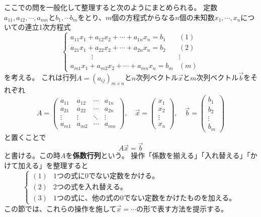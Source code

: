 \documentclass[10pt]{jsreport}
\theoremstyle{definition}%
\newcommand{\kakko}[1]{\left(#1 \right)} %
\newcommand{\vc}[1]{\overrightarrow{#1}}%
\numberwithin{equation}{section}%
\begin{document}
ここでの問を一般化して整理すると次のようにまとめられる。
定数$a_{11},a_{12},\cdots, a_{mn}$と$b_{1},\cdots b_{m}$をとり、$m$個の方程式からなる$n$個の未知数$x_{1},\cdots, x_{n}$についての連立1次方程式
\begin{equation}
  \label{renho-ippan}  \begin{cases}
      a_{11}x_{1}+a_{12}x_{2}+\cdots +a_{1n}x_{n} =b_{1} &  (1)\\
      a_{21}x_{1}+a_{22}x_{2}+\cdots +a_{2n}x_{n} =b_{2} &  (2)\\
      \quad \quad \quad   \vdots & \vdots \\
      a_{m1}x_{1}+a_{m2}x_{2}+\cdots +a_{mn}x_{n} =b_{m} &  (m)
    \end{cases} 
  \end{equation}
を考える。
これは行列$A=(a_{ij})_{m\times n}$と$n$次列ベクトル$\vc{x}$と$m$次列ベクトル$\vc{b}$をそれぞれ
\begin{equation}
  A= \kakko{\begin{matrix}
    a_{11} & a_{12} & \cdots & a_{1n} \\
    a_{21} & a_{22} & \cdots & a_{2n} \\
    \vdots & \vdots & \ddots & \vdots \\
    a_{m1} & a_{m2} &\cdots & a_{mn}
  \end{matrix}},\quad \vc{x}=\kakko{\begin{matrix}
    x_{1}\\
    x_{2}\\
    \vdots\\
    x_{n}
  \end{matrix}},\quad \vc{b}=\kakko{\begin{matrix}
    b_{1}\\
    b_{2}\\
    \vdots\\
    b_{m}
  \end{matrix}}
\end{equation}
と置くことで
\begin{equation}
\label{renho1}  A\vc{x}=\vc{b}
\end{equation}
と書ける。この時$A$を{\bf 係数行列}という。
操作「係数を揃える」「入れ替える」「かけて加える」を整理すると
\begin{equation}
\label{op}  \begin{cases}
    (1) & \text{1つの式に0でない定数をかける。}\\
    (2) & \text{2つの式を入れ替える。}\\
    (3) & \text{1つの式に、他の式の0でない定数をかけたものを加える。}
  \end{cases}
\end{equation}
この節では、これらの操作を施して$\vc{x}=\cdots$の形で表す方法を提示する。
\end{document}
